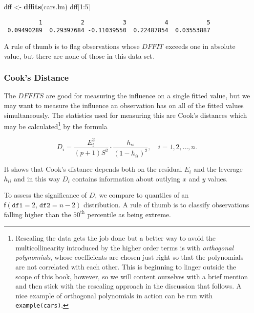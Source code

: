 \documentclass[]{book}
\newenvironment{Shaded}{\begin{snugshade}}{\end{snugshade}}
\newcommand{\KeywordTok}[1]{\textcolor[rgb]{0.13,0.29,0.53}{\textbf{{#1}}}}
\newcommand{\DecValTok}[1]{\textcolor[rgb]{0.00,0.00,0.81}{{#1}}}
\newcommand{\StringTok}[1]{\textcolor[rgb]{0.31,0.60,0.02}{{#1}}}
\newcommand{\NormalTok}[1]{{#1}}
\let\rmarkdownfootnote\footnote%
\def\footnote{\protect\rmarkdownfootnote}
\numberwithin{equation}{chapter}
\numberwithin{figure}{chapter}
\theoremstyle{plain}
\theoremstyle{definition}
\theoremstyle{remark}
\theoremstyle{definition}
\theoremstyle{definition}
\theoremstyle{remark}
\begin{document}
\begin{Shaded}
\begin{Highlighting}[]
\NormalTok{dff <-}\StringTok{ }\KeywordTok{dffits}\NormalTok{(cars.lm)}
\NormalTok{dff[}\DecValTok{1}\NormalTok{:}\DecValTok{5}\NormalTok{]}
\end{Highlighting}
\end{Shaded}

\begin{verbatim}
          1           2           3           4           5 
 0.09490289  0.29397684 -0.11039550  0.22487854  0.03553887 
\end{verbatim}

A rule of thumb is to flag observations whose \(DFFIT\) exceeds one in
absolute value, but there are none of those in this data set.

\subsubsection{Cook's Distance}\label{cooks-distance}

The \(DFFITS\) are good for measuring the influence on a single fitted
value, but we may want to measure the influence an observation has on
all of the fitted values simultaneously. The statistics used for
measuring this are Cook's distances which may be calculated\footnote{Rescaling
  the data gets the job done but a better way to avoid the
  multicollinearity introduced by the higher order terms is with
  \emph{orthogonal polynomials}, whose coefficients are chosen just
  right so that the polynomials are not correlated with each other. This
  is beginning to linger outside the scope of this book, however, so we
  will content ourselves with a brief mention and then stick with the
  rescaling approach in the discussion that follows. A nice example of
  orthogonal polynomials in action can be run with
  \texttt{example(cars)}.} by the formula

\begin{equation}
\label{eq-slr-cooks-distance}
D_{i}=\frac{E_{i}^{2}}{(p+1)S^{2}}\cdot\frac{h_{ii}}{(1-h_{ii})^{2}},\quad i=1,2,\ldots,n.
\end{equation}

It shows that Cook's distance depends both on the residual \(E_{i}\) and
the leverage \(h_{ii}\) and in this way \(D_{i}\) contains information
about outlying \(x\) and \(y\) values.

To assess the significance of \(D\), we compare to quantiles of an
\(\mathsf{f}(\mathtt{df1}=2,\,\mathtt{df2}=n-2)\) distribution. A rule
of thumb is to classify observations falling higher than the
\(50^{\mathrm{th}}\) percentile as being extreme.
\end{document}
